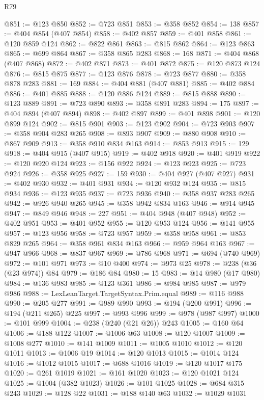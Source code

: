 \begin{lexlean}{R79}
\begin{coremodule}
@851 := @123 @850
@852 := @723 @851
@853 := @358 @852
@854 := 138
@857 := @404 @854 (@407 @854)
@858 := @402 @857
@859 := @401 @858
@861 := @120 @859 @124
@862 := @822 @861
@863 := @815 @862
@864 := @123 @863
@865 := @699 @864
@867 := @358 @865 @283
@868 := 168
@871 := @404 @868 (@407 @868)
@872 := @402 @871
@873 := @401 @872
@875 := @120 @873 @124
@876 := @815 @875
@877 := @123 @876
@878 := @723 @877
@880 := @358 @878 @283
@881 := 169
@884 := @404 @881 (@407 @881)
@885 := @402 @884
@886 := @401 @885
@888 := @120 @886 @124
@889 := @815 @888
@890 := @123 @889
@891 := @723 @890
@893 := @358 @891 @283
@894 := 175
@897 := @404 @894 (@407 @894)
@898 := @402 @897
@899 := @401 @898
@901 := @120 @899 @124
@902 := @815 @901
@903 := @123 @902
@904 := @723 @903
@907 := @358 @904 @283 @265
@908 := @893 @907
@909 := @880 @908
@910 := @867 @909
@913 := @358 @910 @834 @163
@914 := @853 @913
@915 := 129
@918 := @404 @915 (@407 @915)
@919 := @402 @918
@920 := @401 @919
@922 := @120 @920 @124
@923 := @156 @922
@924 := @123 @923
@925 := @723 @924
@926 := @358 @925
@927 := 159
@930 := @404 @927 (@407 @927)
@931 := @402 @930
@932 := @401 @931
@934 := @120 @932 @124
@935 := @815 @934
@936 := @123 @935
@937 := @723 @936
@940 := @358 @937 @283 @265
@942 := @926 @940 @265
@945 := @358 @942 @834 @163
@946 := @914 @945
@947 := @849 @946
@948 := 227
@951 := @404 @948 (@407 @948)
@952 := @402 @951
@953 := @401 @952
@955 := @120 @953 @124
@956 := @141 @955
@957 := @123 @956
@958 := @723 @957
@959 := @358 @958
@961 := @853 @829 @265
@964 := @358 @961 @834 @163
@966 := @959 @964 @163
@967 := @947 @966
@968 := @837 @967
@969 := @786 @968
@971 := @694 (@740 @969)
@972 := @101 @971
@973 := @10 @400
@974 := @973 @25
@978 := @238 (@36 (@23 @974)) @84
@979 := @186 @84
@980 := 15
@983 := @14 @980 (@17 @980)
@984 := @136 @983
@985 := @123 @361
@986 := @984 @985
@987 := @979 @986
@988 := LexLeanTarget.TargetSyntax.Prim.equal
@989 := @116 @988
@990 := @205 @277
@991 := @989 @990
@993 := @194 (@200 @991)
@996 := @194 (@211 @265) @225
@997 := @993 @996
@999 := @978 (@987 @997)
@1000 := @101 @999
@1004 := @238 (@240 (@21 @26)) @243
@1005 := @160 @64
@1006 := @188 @122
@1007 := @1006 @63
@1008 := @120 @1007
@1009 := @1008 @277
@1010 := @141 @1009
@1011 := @1005 @1010
@1012 := @120 @1011
@1013 := @1006 @19
@1014 := @120 @1013
@1015 := @1014 @124
@1016 := @1012 @1015
@1017 := @688 @1016
@1019 := @120 @1017 @175
@1020 := @261 @1019
@1021 := @161 @1020
@1023 := @120 @1021 @124
@1025 := @1004 (@382 @1023)
@1026 := @101 @1025
@1028 := @684 @315 @243
@1029 := @128 @22
@1031 := @188 @140 @63
@1032 := @1029 @1031

\end{coremodule}
\end{lexlean}
